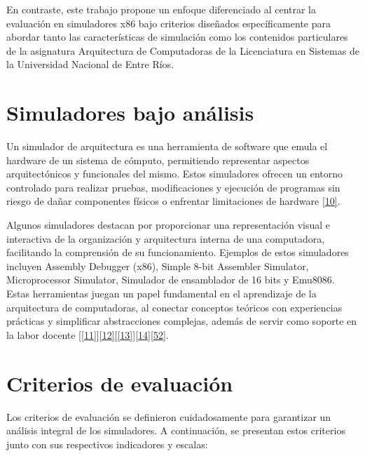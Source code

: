\documentclass[12pt,oneside]{templates/unerthesis}
\begin{document}
En contraste, este trabajo propone un enfoque diferenciado al centrar la evaluación en simuladores x86 bajo criterios diseñados específicamente para abordar tanto las características de simulación como los contenidos particulares de la asignatura Arquitectura de Computadoras de la Licenciatura en Sistemas de la Universidad Nacional de Entre Ríos.

\hypertarget{simuladores-bajo-anuxe1lisis}{%
\section{Simuladores bajo análisis}\label{simuladores-bajo-anuxe1lisis}}

Un simulador de arquitectura es una herramienta de software que emula el hardware de un sistema de cómputo, permitiendo representar aspectos arquitectónicos y funcionales del mismo. Estos simuladores ofrecen un entorno controlado para realizar pruebas, modificaciones y ejecución de programas sin riesgo de dañar componentes físicos o enfrentar limitaciones de hardware \protect\hyperlink{ref-radivojevic_design_2011}{{[}10{]}}.

Algunos simuladores destacan por proporcionar una representación visual e interactiva de la organización y arquitectura interna de una computadora, facilitando la comprensión de su funcionamiento. Ejemplos de estos simuladores incluyen Assembly Debugger (x86), Simple 8-bit Assembler Simulator, Microprocessor Simulator, Simulador de ensamblador de 16 bits y Emu8086. Estas herramientas juegan un papel fundamental en el aprendizaje de la arquitectura de computadoras, al conectar conceptos teóricos con experiencias prácticas y simplificar abstracciones complejas, además de servir como soporte en la labor docente {[}\protect\hyperlink{ref-nikolic_survey_2009}{{[}11{]}}{]}\protect\hyperlink{ref-hasan_survey_2012}{{[}12{]}}{[}\protect\hyperlink{ref-hennessy2017computer}{{[}13{]}}{]}\protect\hyperlink{ref-stallings_computer_2021}{{[}14{]}}\protect\hyperlink{ref-behrooz_computer_2005}{{[}52{]}}.

\hypertarget{criterios-de-evaluaciuxf3n}{%
\section{Criterios de evaluación}\label{criterios-de-evaluaciuxf3n}}

Los criterios de evaluación se definieron cuidadosamente para garantizar un análisis integral de los simuladores. A continuación, se presentan estos criterios junto con sus respectivos indicadores y escalas:
\end{document}
